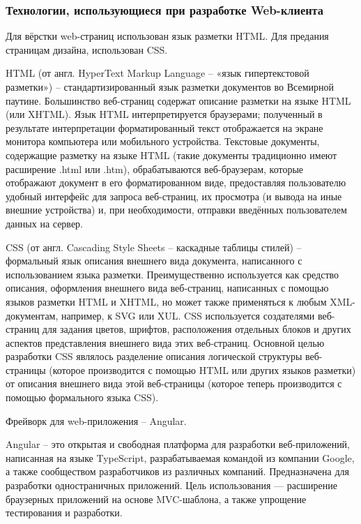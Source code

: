 
\subsubsection{Технологии, использующиеся при разработке Web-клиента}\indent

Для вёрстки web-страниц использован язык разметки HTML. Для предания страницам дизайна, использован CSS.

HTML (от англ. HyperText Markup Language – «язык гипертекстовой разметки») – стандартизированный язык разметки документов во Всемирной паутине.
Большинство веб-страниц содержат описание разметки на языке HTML (или XHTML).
Язык HTML интерпретируется браузерами;
полученный в результате интерпретации форматированный текст отображается на экране монитора компьютера или мобильного устройства.
Текстовые документы, содержащие разметку на языке HTML (такие документы традиционно имеют расширение .html или .htm), обрабатываются веб-браузерам, которые отображают документ в его форматированном виде, предоставляя пользователю удобный интерфейс для запроса веб-страниц, их просмотра (и вывода на иные внешние устройства) и, при необходимости, отправки введённых пользователем данных на сервер.\cite{web-technologies}

CSS (от англ. Cascading Style Sheets – каскадные таблицы стилей) – формальный язык описания внешнего вида документа, написанного с использованием языка разметки.
Преимущественно используется как средство описания, оформления внешнего вида веб-страниц, написанных с помощью языков разметки HTML и XHTML, но может также применяться к любым XML-документам, например, к SVG или XUL. CSS используется создателями веб-страниц для задания цветов, шрифтов, расположения отдельных блоков и других аспектов представления внешнего вида этих веб-страниц. Основной целью разработки CSS являлось разделение описания логической структуры веб-страницы (которое производится с помощью HTML или других языков разметки) от описания внешнего вида этой веб-страницы (которое теперь производится с помощью формального языка CSS).\cite{web-technologies}

Фрейворк для web-приложения – Angular.

Angular – это открытая и свободная платформа для разработки веб-приложений, написанная на языке TypeScript, разрабатываемая командой из компании Google, 
а также сообществом разработчиков из различных компаний.
Предназначена для разработки одностраничных приложений.
Цель использования — расширение браузерных приложений на основе MVC-шаблона, а также упрощение тестирования и разработки.

